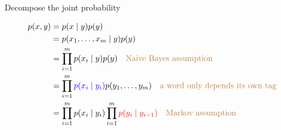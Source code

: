\documentclass[usenames,dvipsnames,notes,11pt,aspectratio=169]{beamer}
\newcommand{\pdfnote}[1]{}
\begin{document}
\begin{frame}
    {Decompose the joint probability}
    \begin{align*}
        p(x, y) &= p(x\mid y)p(y) \\
        &= p(x_1,\ldots,x_m \mid y)p(y) \\
        &= \prod_{i=1}^m p(x_i\mid y)p(y) \quad \text{\textcolor{brown}{Naive Bayes assumption}} \\
        &= \prod_{i=1}^m {\color{blue}p(x_i\mid y_i)}p(y_1,\ldots,y_m) \quad \text{\textcolor{brown}{a word only depends its own tag}} \\
        &= \prod_{i=1}^m p(x_i\mid y_i)\prod_{i=1}^m {\color{red}p(y_i\mid y_{i-1})} \quad \text{\textcolor{brown}{Markov assumption}}
    \end{align*}
    \pdfnote{
        Modeling p(x1,x2,...xm | y) is a problem we encountered before. (NB models)
    }
    \pdfnote{
        If we ignore the fact that y is a sequence, then this is NB.
    }
    \pdfnote{
        To reduce learning and inference complexity, we make additional Markov assumptions.
    }
    \pdfnote{
        Note that to make the model managable, each time we are making some independence assumptions. Graphically, this corresponds to starting with a complete graph, then removing edges.
    }
\end{frame}
\end{document}
